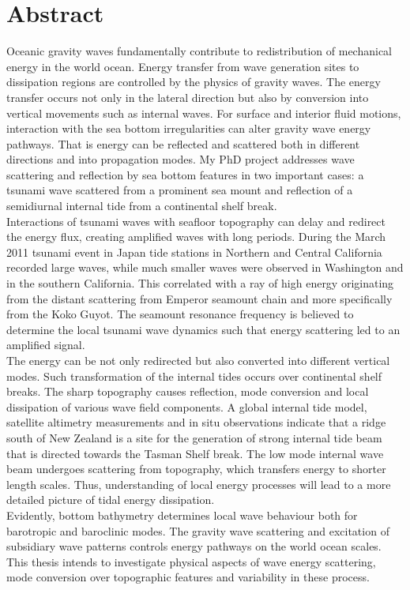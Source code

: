 \section{Abstract}
Oceanic gravity waves fundamentally contribute to redistribution of mechanical energy in the world ocean. Energy transfer from wave generation sites to dissipation regions are controlled by the physics of gravity waves. The energy transfer occurs not only in the lateral direction but also by conversion into vertical movements such as internal waves. For surface and interior fluid motions, interaction with the sea bottom irregularities can alter gravity wave energy pathways. That is energy can be reflected and scattered both in different directions and into propagation modes. My PhD project addresses wave scattering and reflection by sea bottom features in two important cases: a tsunami wave scattered from a prominent sea mount and reflection of a semidiurnal internal tide from a continental shelf break.\\
Interactions of tsunami waves with seafloor topography can delay and redirect the energy flux, creating amplified waves with long periods. During the March 2011 tsunami event in Japan tide stations in Northern and Central California recorded large waves, while much smaller waves were observed in Washington and in the southern California. This correlated with a ray of high energy originating from the distant scattering from Emperor seamount chain and more specifically from the Koko Guyot. The seamount resonance frequency is believed to determine the local tsunami wave dynamics such that energy scattering led to an amplified signal.\\
The energy can be not only redirected but also converted into different vertical modes. Such transformation of the internal tides occurs over continental shelf breaks. The sharp topography causes reflection, mode conversion and local dissipation of various wave field components. A global internal tide model, satellite altimetry measurements and in situ observations indicate that a ridge south of New Zealand is a site for the generation of strong internal tide beam that is directed towards the Tasman Shelf break. The low mode internal wave beam undergoes scattering from topography, which transfers energy to shorter length scales. Thus, understanding of local energy processes will lead to a more detailed picture of tidal energy dissipation.\\
Evidently, bottom bathymetry determines local wave behaviour both for barotropic and baroclinic modes. The gravity wave scattering and excitation of subsidiary wave patterns controls energy pathways on the world ocean scales. This thesis intends to investigate physical aspects of wave energy scattering,  mode conversion over topographic features and variability in these process.

